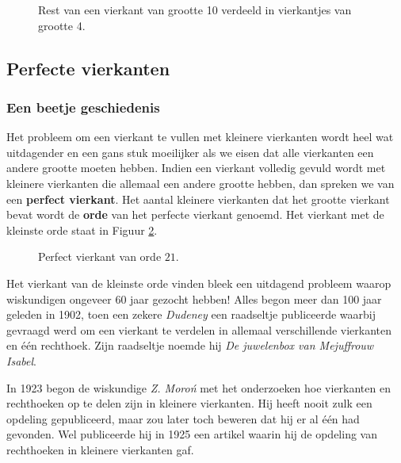 

\begin{figure}[ht]
  \centering
  
  \caption{Rest van een vierkant van grootte 10 verdeeld in vierkantjes van grootte 4.}
  \label{fig:vierkant10_4x4}
\end{figure}

\newpage
\subsection{Perfecte vierkanten}

\subsubsection{Een beetje geschiedenis}

Het probleem om een vierkant te vullen met kleinere vierkanten wordt heel wat uitdagender en een gans stuk moeilijker als we eisen dat alle vierkanten een andere grootte moeten hebben. Indien een vierkant volledig gevuld wordt met kleinere vierkanten die allemaal een andere grootte hebben, dan spreken we van een {\bf perfect vierkant}. Het aantal kleinere vierkanten dat het grootte vierkant bevat wordt de {\bf orde} van het perfecte vierkant genoemd. Het vierkant met de kleinste orde staat in Figuur \ref{fig:pv21}.

\begin{figure}[ht]
  \centering
  
  \caption{Perfect vierkant van orde $21$.}
  \label{fig:pv21}
\end{figure}

Het vierkant van de kleinste orde vinden bleek een uitdagend probleem waarop wiskundigen ongeveer 60 jaar gezocht hebben! Alles begon meer dan 100 jaar geleden in 1902, toen een zekere {\it Dudeney} een raadseltje publiceerde waarbij gevraagd werd om een vierkant te verdelen in allemaal verschillende vierkanten en \'e\'en rechthoek. Zijn raadseltje noemde hij {\it De juwelenbox van Mejuffrouw Isabel}.

In 1923 begon de wiskundige {\it Z. Moro\'n} met het onderzoeken hoe vierkanten en rechthoeken op te delen zijn in kleinere vierkanten. Hij heeft nooit zulk een opdeling gepubliceerd, maar zou later toch beweren dat hij er al \'e\'en had gevonden. Wel publiceerde hij in 1925 een artikel waarin hij de opdeling van rechthoeken in kleinere vierkanten gaf.

